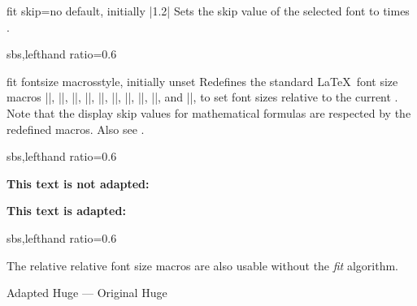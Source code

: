 \begin{docTcbKey}{fit skip}{=}{no default, initially |1.2|}
  Sets the skip value of the selected font to  times .

\begin{dispExample*}{sbs,lefthand ratio=0.6}

\begin{tcolorbox}[fit to=5cm and 4cm,
  fit skip=1.0  ]
  \lipsum[1]
\end{tcolorbox}
\end{dispExample*}
\end{docTcbKey}



 
\begin{docTcbKey}{fit fontsize macros}{}{style, initially unset}
  Redefines the standard \LaTeX\ font size macros
  |\tiny|, |\scriptsize|, |\footnotesize|, |\small|, |\normalsize|,
  |\large|, |\Large|, |\LARGE|, |\huge|, and |\Huge|,
  to set font sizes relative to
  the current . Note that the display skip values for
  mathematical formulas are respected by the redefined macros.
  Also see .

\begin{dispExample*}{sbs,lefthand ratio=0.6}

\begin{tcolorbox}[fit to height=4cm]
  {\Large\bfseries This text is
             not adapted:\par}
  \lipsum[2]
\end{tcolorbox}

\begin{tcolorbox}[fit to height=4cm,
  fit fontsize macros ]
  {\Large\bfseries This text is adapted:\par}
  \lipsum[2]
\end{tcolorbox}
\end{dispExample*}

\begin{dispExample*}{sbs,lefthand ratio=0.6}

\let\realHuge=\Huge

\begin{tcolorbox}[fit basedim=7pt,
  fontupper=\normalsize,
  fit fontsize macros]
The relative relative font size macros
are also usable without the
\textit{fit} algorithm.\par
{\Huge Adapted Huge} ---
{\realHuge Original Huge}
\end{tcolorbox}


\end{dispExample*}
\end{docTcbKey}
